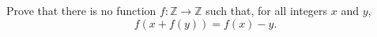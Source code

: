 Prove that there is no function $f : \mathbb{Z} \to \mathbb{Z}$ such that, for all integers $x$ and $y$,
\[
f(x + f(y)) = f(x) - y.
\]
